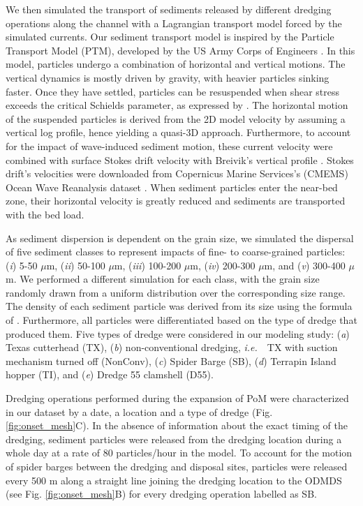 \documentclass[preprint,12pt,authoryear]{elsarticle}
\newcommand{\ie}{{\it i.e.}\ }
\begin{document}
We then simulated the transport of sediments released by different dredging operations along the channel with a Lagrangian transport model forced by the simulated currents. Our sediment transport model is inspired by the Particle Transport Model (PTM), developed by the US Army Corps of Engineers \citep{macdonald2006ptm}. In this model, particles undergo a combination of horizontal and vertical motions. The vertical dynamics is mostly driven by gravity, with heavier particles sinking faster. Once they have settled, particles can be resuspended when shear stress exceeds the critical Schields parameter, as expressed by \cite{soulsby1997threshold}. The horizontal motion of the suspended particles is derived from the 2D model velocity by assuming a vertical log profile, hence yielding a quasi-3D approach. Furthermore, to account for the impact of wave-induced sediment motion, these current velocity were combined with surface Stokes drift velocity with Breivik's vertical profile \citep{breivik2016stokes}. Stokes drift's velocities were downloaded from Copernicus Marine Services's (CMEMS) Ocean Wave Reanalysis dataset \citep{cmems}. When sediment particles enter the near-bed zone, their horizontal velocity is greatly reduced and sediments are transported with the bed load.

As sediment dispersion is dependent on the grain size, we simulated the dispersal of five sediment classes to represent impacts of fine- to coarse-grained particles: (\textit{i}) 5-50 $\mu$m, (\textit{ii}) 50-100 $\mu$m, (\textit{iii}) 100-200 $\mu$m, (\textit{iv}) 200-300 $\mu$m, and (\textit{v}) 300-400 $\mu$m. We performed a  different simulation for each class, with the grain size randomly drawn from a uniform distribution over the corresponding size range. The density of each sediment particle was derived from its size using the formula of \cite{hamilton1982sound}. Furthermore, all particles were differentiated based on the type of dredge that produced them. Five types of dredge were considered in our modeling study: (\textit{a}) Texas cutterhead (TX), (\textit{b}) non-conventional dredging, \ie~TX with suction mechanism turned off (NonConv), (\textit{c}) Spider Barge (SB), (\textit{d}) Terrapin Island hopper (TI), and (\textit{e}) Dredge 55 clamshell (D55).

Dredging operations performed during the expansion of PoM were characterized in our dataset by a date, a location and a type of dredge (Fig. \ref{fig:onset_mesh}C). In the absence of information about the exact timing of the dredging, sediment particles were released from the dredging location during a whole day at a rate of 80 particles/hour in the model. To account for the motion of spider barges between the dredging and disposal sites, particles were released every 500 m along a straight line joining the dredging location to the ODMDS (see Fig. \ref{fig:onset_mesh}B) for every dredging operation labelled as SB.
\end{document}
